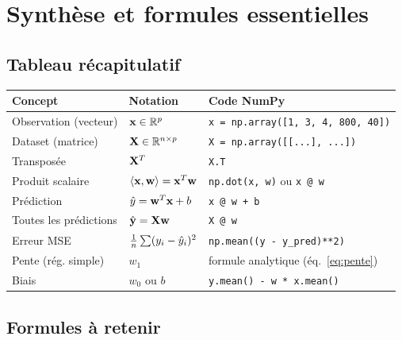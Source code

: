 \section{Synth\`{e}se et formules essentielles}

\subsection{Tableau r\'{e}capitulatif}

\begin{center}
\renewcommand{\arraystretch}{1.4}
\begin{tabularx}{\textwidth}{l >{\centering\arraybackslash}p{4cm} X}
    \toprule
    \textbf{Concept} & \textbf{Notation} & \textbf{Code NumPy} \\
    \midrule
    Observation (vecteur)
        & $\mathbf{x} \in \mathbb{R}^p$
        & \texttt{x = np.array([1, 3, 4, 800, 40])} \\
    Dataset (matrice)
        & $\mathbf{X} \in \mathbb{R}^{n \times p}$
        & \texttt{X = np.array([[...], ...])} \\
    Transpos\'{e}e
        & $\mathbf{X}^T$
        & \texttt{X.T} \\
    Produit scalaire
        & $\langle \mathbf{x}, \mathbf{w} \rangle = \mathbf{x}^T\mathbf{w}$
        & \texttt{np.dot(x, w)} ou \texttt{x @ w} \\
    Pr\'{e}diction
        & $\hat{y} = \mathbf{w}^T\mathbf{x} + b$
        & \texttt{x @ w + b} \\
    Toutes les pr\'{e}dictions
        & $\hat{\mathbf{y}} = \mathbf{X}\mathbf{w}$
        & \texttt{X @ w} \\
    Erreur MSE
        & $\tfrac{1}{n}\sum(y_i - \hat{y}_i)^2$
        & \texttt{np.mean((y - y\_pred)**2)} \\
    Pente (r\'{e}g. simple)
        & $w_1$
        & formule analytique (\'{e}q.~\ref{eq:pente}) \\
    Biais
        & $w_0$ ou $b$
        & \texttt{y.mean() - w * x.mean()} \\
    \bottomrule
\end{tabularx}
\end{center}

\subsection{Formules \`{a} retenir}

